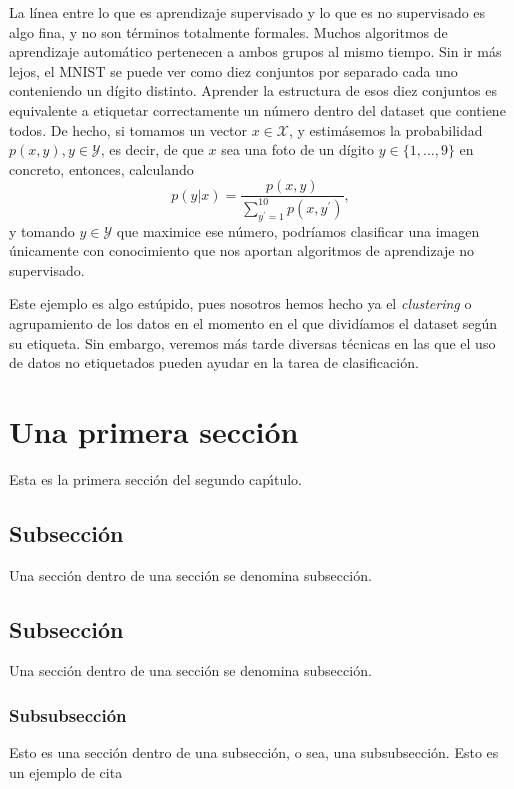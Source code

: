 \documentclass[a4paper, 12pt, oneside]{book}
\begin{document}
La línea entre lo que es aprendizaje supervisado y lo que es no supervisado es algo fina, y no son términos totalmente formales.
Muchos algoritmos de aprendizaje automático pertenecen a ambos grupos al mismo tiempo. 
Sin ir más lejos, el MNIST se puede ver como diez conjuntos por separado cada uno conteniendo un dígito distinto. Aprender la estructura de esos diez conjuntos es equivalente a etiquetar correctamente un número dentro del dataset que contiene todos.
De hecho, si tomamos un vector \(x \in \mathcal{X} \), y estimásemos la probabilidad \(p(x, y), y \in \mathcal{Y}\), es decir, de que \(x\) sea una foto de un dígito
\(y \in \{1, \dots ,9\} \) en concreto, entonces, calculando
\[
    p(y|x) = \frac{p(x, y)}{\sum_{y^{\prime} =1}^{10}p(x, y^{\prime} )}
,\]
y tomando \(y \in \mathcal{Y}\) que maximice ese número, podríamos clasificar una imagen únicamente con conocimiento que nos aportan algoritmos de aprendizaje no supervisado. 

Este ejemplo es algo estúpido, pues nosotros hemos hecho ya el \textit{clustering} o agrupamiento de los datos en el momento en el que dividíamos el dataset según su etiqueta.
Sin embargo, veremos más tarde diversas técnicas en las que el uso de datos no etiquetados pueden ayudar en la tarea de clasificación. 
\section{Una primera secci\'{o}n}
Esta es la primera secci\'{o}n del segundo cap\'{\i}tulo.
\subsection{Subsecci\'{o}n}
Una secci\'{o}n dentro de una secci\'{o}n se denomina subsecci\'{o}n.
\subsection{Subsecci\'{o}n}
Una secci\'{o}n dentro de una secci\'{o}n se denomina subsecci\'{o}n.
\subsubsection{Subsubsecci\'{o}n}
Esto es una secci\'{o}n dentro de una subsecci\'{o}n, o sea, una subsubsecci\'{o}n.
Esto es un ejemplo de cita \cite{Zfinitegrading}

\nocite{*}

\end{document}
